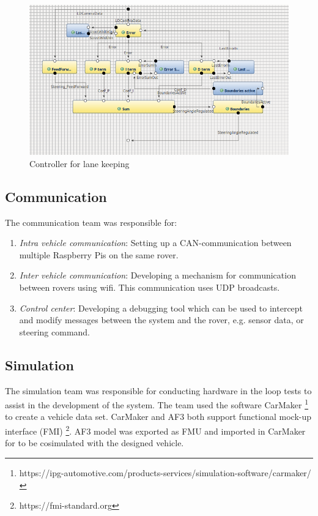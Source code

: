 \begin{figure}[!h]
	\centering
	\includegraphics[width=1\textwidth]{./img/LK_Controller_Screenshot.png}
	\caption{Controller for lane keeping}
	\label{fig:lane_keeping}
\end{figure}


\subsection{Communication}

The communication team was responsible for: 
\begin{enumerate}
	\item \textit{Intra vehicle communication}: Setting up a CAN-communication between multiple Raspberry Pis on the same rover.
	\item \textit{Inter vehicle communication}: Developing a mechanism for communication between rovers using wifi. This communication uses UDP broadcasts.
	\item \textit{Control center}:  Developing a debugging tool which can be used to intercept and modify messages between the system and the rover, e.g. sensor data, or steering command.
\end{enumerate}

\subsection{Simulation}

The simulation team was responsible for conducting hardware in the loop tests to assist in the development of the system. The team used the software CarMaker \footnote{https://ipg-automotive.com/products-services/simulation-software/carmaker/} to create a vehicle data set. CarMaker and AF3 both support functional mock-up interface (FMI) \footnote{https://fmi-standard.org}. AF3 model was exported as FMU and imported in CarMaker for to be cosimulated with the designed vehicle.

